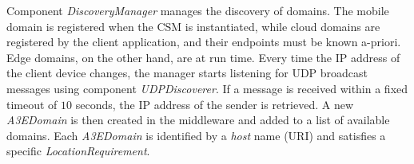 
Component \textit{DiscoveryManager} manages the discovery of domains. The mobile domain is registered when the CSM is instantiated, while cloud domains are registered by the client application, and their endpoints must be known a-priori. Edge domains, on the other hand, are  at run time. Every time the IP address of the client device changes, the manager starts listening for UDP broadcast messages using component \textit{UDPDiscoverer}. If a message is received within a fixed timeout of $10$ seconds, the IP address of the sender is retrieved. A new \textit{A3EDomain} is then created in the middleware and added to a list of available domains. Each \textit{A3EDomain} is identified by a \textit{host} name (URI) and satisfies a specific \textit{LocationRequirement}. 





